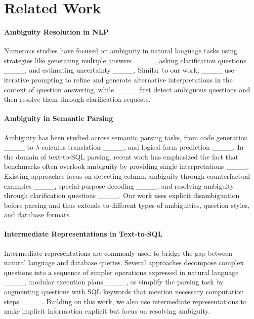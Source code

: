 \section{Related Work}
\paragraph{Ambiguity Resolution in NLP} Numerous studies have focused on ambiguity in natural language tasks using strategies like generating multiple answers ____, asking clarification questions ____, and estimating uncertainty ____. Similar to our work, ____ use iterative prompting to refine and generate alternative interpretations in the context of question answering, while ____ first detect ambiguous questions and then resolve them through clarification requests. 

 \paragraph{Ambiguity in Semantic Parsing} Ambiguity has been studied across semantic parsing tasks, from code generation ____ to $\lambda$-calculus translation ____,  and logical form prediction ____. In the domain of text-to-SQL parsing, recent work has emphasized the fact that benchmarks often overlook ambiguity by providing single interpretations ____. Existing approaches focus on detecting column ambiguity through counterfactual examples ____, special-purpose decoding ____, and resolving ambiguity through clarification questions ____. Our work uses explicit disambiguation before parsing and thus extends to different types of ambiguities, question styles, and database formats.

\paragraph{Intermediate Representations in Text-to-SQL} Intermediate representations are commonly used to bridge the gap between natural language and database queries. Several approaches decompose complex questions into a sequence of simpler operations expressed in natural language   ____, modular execution plans ____, or simplify the parsing task by augmenting questions with SQL keywords that mention necessary computation steps ____. Building on this work, we also use intermediate representations to make implicit information explicit but focus on resolving ambiguity.


